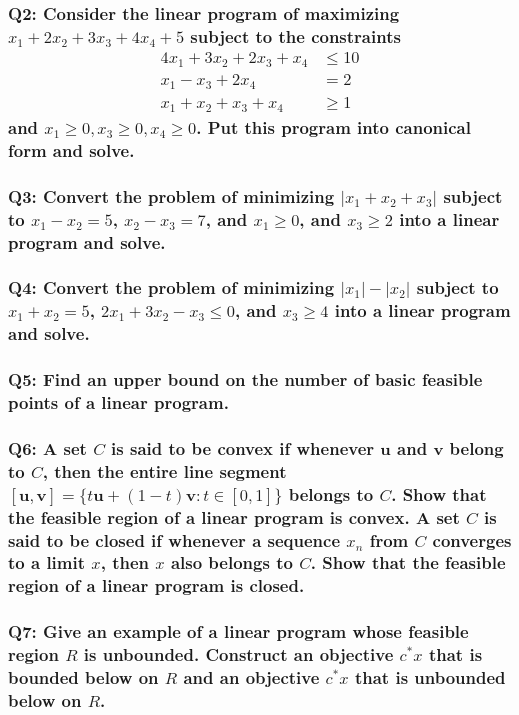 \documentclass{article}
\begin{document}
\subsubsection*{Q2: Consider the linear program of maximizing \(x_1 + 2x_2 + 3x_3 + 4x_4 + 5\) subject to the constraints
\[
\begin{aligned}
4x_1 + 3x_2 + 2x_3 + x_4 &\leq 10 \\
x_1 - x_3 + 2x_4 &= 2 \\
x_1 + x_2 + x_3 + x_4 &\geq 1
\end{aligned}
\]
and \(x_1 \geq 0, x_3 \geq 0, x_4 \geq 0\). Put this program into canonical form and solve.}

\subsubsection*{Q3: Convert the problem of minimizing \(|x_1 + x_2 + x_3|\) subject to \(x_1 - x_2 = 5\), \(x_2 - x_3 = 7\), and \(x_1 \geq 0\), and \(x_3 \geq 2\) into a linear program and solve.}

\subsubsection*{Q4: Convert the problem of minimizing \(|x_1| - |x_2|\) subject to \(x_1 + x_2 = 5\), \(2x_1 + 3x_2 - x_3 \leq 0\), and \(x_3 \geq 4\) into a linear program and solve.}

\subsubsection*{Q5: Find an upper bound on the number of basic feasible points of a linear program.}

\subsubsection*{Q6: A set \(C\) is said to be convex if whenever \(\mathbf{u}\) and \(\mathbf{v}\) belong to \(C\), then the entire line segment \([\mathbf{u}, \mathbf{v}] = \{t \mathbf{u} + (1 - t) \mathbf{v} : t \in [0, 1]\}\) belongs to \(C\). Show that the feasible region of a linear program is convex. A set \(C\) is said to be closed if whenever a sequence \(x_n\) from \(C\) converges to a limit \(x\), then \(x\) also belongs to \(C\). Show that the feasible region of a linear program is closed.}

\subsubsection*{Q7: Give an example of a linear program whose feasible region \(R\) is unbounded. Construct an objective \(c^* x\) that is bounded below on \(R\) and an objective \(c^* x\) that is unbounded below on \(R\).}
\end{document}
